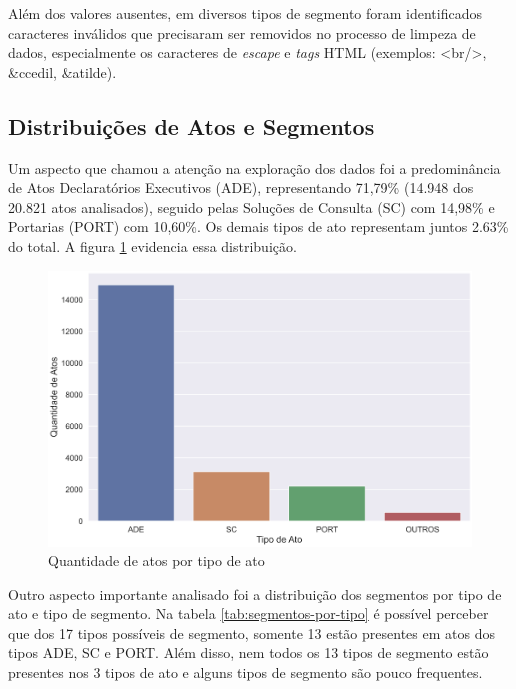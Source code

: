 Além dos valores ausentes, em diversos tipos de segmento foram identificados caracteres inválidos que precisaram ser removidos no processo de limpeza de dados, especialmente os caracteres de \textit{escape} e \textit{tags} HTML (exemplos: <br/>, \&ccedil, \&atilde).

\subsection{Distribuições de Atos e Segmentos}

Um aspecto que chamou a atenção na exploração dos dados foi a predominância de Atos Declaratórios Executivos (ADE), representando 71,79\% (14.948 dos 20.821 atos analisados), seguido pelas Soluções de Consulta (SC) com 14,98\% e Portarias (PORT) com 10,60\%. Os demais tipos de ato representam juntos 2.63\% do total. A figura \ref{fig:atos-por-tipo-ato} evidencia essa distribuição.

\begin{figure}[h]
	\caption{Quantidade de atos por tipo de ato}
	\center
	\label{fig:atos-por-tipo-ato}
	\includegraphics[scale=1.9]{exploratoria/atos-por-tipo-ato.png}
	\fdp
\end{figure}

Outro aspecto importante analisado foi a distribuição dos segmentos por tipo de ato e tipo de segmento. Na tabela \ref{tab:segmentos-por-tipo} é possível perceber que dos 17 tipos possíveis de segmento, somente 13 estão presentes em atos dos tipos ADE, SC e PORT. Além disso, nem todos os 13 tipos de segmento estão presentes nos 3 tipos de ato e alguns tipos de segmento são pouco frequentes.

